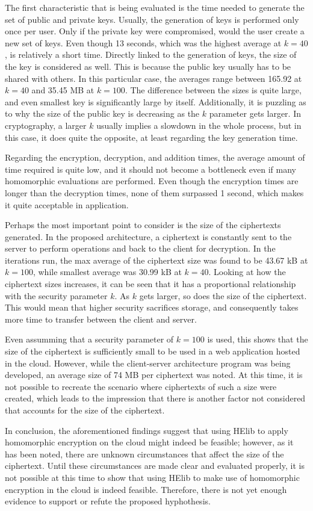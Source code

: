 The first characteristic that is being evaluated is the time needed to generate the set of public and private keys. Usually, the generation of keys is performed only once per user. Only if the private key were compromised, would the user create a new set of keys. Even though 13 seconds, which was the highest average at $k=40$, is relatively a short time. Directly linked to the generation of keys, the size of the key is considered as well. This is because the public key usually has to be shared with others. In this particular case, the averages range between 165.92 at $k=40$  and 35.45 MB at $k=100$. The difference between the sizes is quite large, and even smallest key is significantly large by itself. Additionally, it is puzzling as to why the size of the public key is decreasing as the $k$ parameter gets larger. In cryptography, a larger $k$ usually implies a slowdown in the whole process, but in this case, it does quite the opposite, at least regarding the key generation time.

Regarding the encryption, decryption, and addition times, the average amount of time required is quite low, and it should not become a bottleneck even if many homomorphic evaluations are performed. Even though the encryption times are longer than the decryption times, none of them surpassed 1 second, which makes it quite acceptable in application. 

Perhaps the most important point to consider is the size of the ciphertexts generated. In the proposed architecture, a ciphertext is constantly sent to the server to perform operations and back to the client for decryption. In the iterations run, the max average of the ciphertext size was found to be 43.67 kB at $k=100$, while smallest average was 30.99 kB at $k=40$. Looking at how the ciphertext sizes increases, it can be seen that it has a proportional relationship with the security parameter $k$. As $k$ gets larger, so does the size of the ciphertext. This would mean that higher security sacrifices storage, and consequently takes more time to transfer between the client and server.

Even assumming that a security parameter of $k=100$ is used, this shows that the size of the ciphertext is sufficiently small to be used in a web application hosted in the cloud. However, while the client-server architecture program was being developed, an average size of 74 MB per ciphertext was noted. At this time, it is not possible to recreate the scenario where ciphertexts of such a size were created, which leads to the impression that there is another factor not considered that accounts for the size of the ciphertext.

In conclusion, the aforementioned findings suggest that using HElib to apply homomorphic encryption on the cloud might indeed be feasible; however, as it has been noted, there are unknown circumstances that affect the size of the ciphertext. Until these circumstances are made clear and evaluated properly, it is not possible at this time to show that using HElib to make use of homomorphic encryption in the cloud is indeed feasible. Therefore, there is not yet enough evidence to support or refute the proposed hyphothesis.

\clearpage
